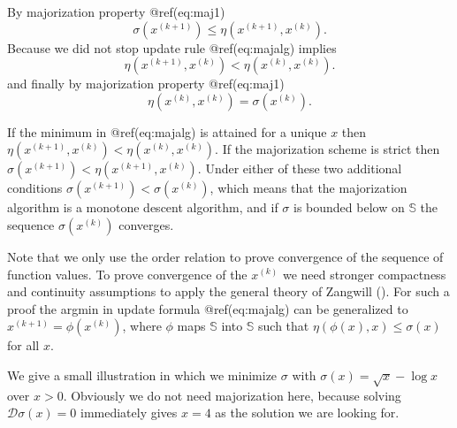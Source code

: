\documentclass[
  12pt,
  letterpaper,
  DIV=11,
  numbers=noendperiod]{scrartcl}
\begin{document}
By majorization property @ref(eq:maj1) \begin{equation}
\sigma(x^{(k+1)})\leq\eta(x^{(k+1)},x^{(k)}).
\end{equation} Because we did not stop update rule @ref(eq:majalg)
implies \begin{equation}
\eta(x^{(k+1)},x^{(k)})<\eta(x^{(k)},x^{(k)}).
\end{equation} and finally by majorization property @ref(eq:maj1)
\begin{equation}
\eta(x^{(k)},x^{(k)})=\sigma(x^{(k)}).
\end{equation}

If the minimum in @ref(eq:majalg) is attained for a unique \(x\) then
\(\eta(x^{(k+1)},x^{(k)})<\eta(x^{(k)},x^{(k)})\). If the majorization
scheme is strict then \(\sigma(x^{(k+1)})<\eta(x^{(k+1)},x^{(k)})\).
Under either of these two additional conditions
\(\sigma(x^{(k+1)})<\sigma(x^{(k)})\), which means that the majorization
algorithm is a monotone descent algorithm, and if \(\sigma\) is bounded
below on \(\mathbb{S}\) the sequence \(\sigma(x^{(k)})\) converges.

Note that we only use the order relation to prove convergence of the
sequence of function values. To prove convergence of the \(x^{(k)}\) we
need stronger compactness and continuity assumptions to apply the
general theory of Zangwill (). For such
a proof the argmin in update formula @ref(eq:majalg) can be generalized
to \(x^{(k+1)}=\phi(x^{(k)})\), where \(\phi\) maps \(\mathbb{S}\) into
\(\mathbb{S}\) such that \(\eta(\phi(x),x)\leq\sigma(x)\) for all \(x\).

We give a small illustration in which we minimize \(\sigma\) with
\(\sigma(x)=\sqrt{x}-\log{x}\) over \(x>0\). Obviously we do not need
majorization here, because solving \(\mathcal{D}\sigma(x)=0\)
immediately gives \(x=4\) as the solution we are looking for.
\end{document}

